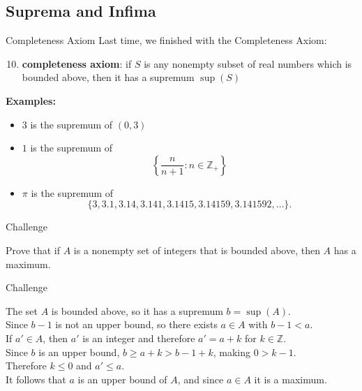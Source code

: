 \documentclass{beamer}
\begin{document}
\subsection{Suprema and Infima}
\begin{frame}{Completeness Axiom}
Last time, we finished with the Completeness Axiom:
\pause
\begin{enumerate}[\text{A}1]
\setcounter{enumi}{9}
\pause
\item \textbf{completeness axiom}: if $S$ is any nonempty subset of real numbers which is bounded above, then it has a supremum $\sup(S)$
\end{enumerate}
\pause
\textbf{Examples:}
\begin{itemize}
\pause
\item $3$ is the supremum of $(0,3)$
\pause
\item $1$ is the supremum of
$$\left\lbrace
\frac{n}{n+1}: n\in\mathbb{Z}_+
\right\rbrace$$
\pause
\item $\pi$ is the supremum of
$$\{3,3.1,3.14,3.141,3.1415,3.14159,3.141592,\dots\}.$$
\end{itemize}
\end{frame}

\begin{frame}{Challenge}
\begin{prob}
Prove that if $A$ is a nonempty set of integers that is bounded above, then $A$ has a maximum.
\end{prob}
\end{frame}

\begin{frame}{Challenge}
\begin{soln}
The set $A$ is bounded above, so it has a supremum $b=\sup(A)$. \\
\pause
Since $b-1$ is not an upper bound, so there exists $a\in A$ with $b-1 < a$. \\
\pause
If $a'\in A$, then $a'$ is an integer and therefore $a' = a+k$ for $k\in \mathbb{Z}$. \\
\pause
Since $b$ is an upper bound, $b\geq a+k>b-1+k$, making $0 > k-1$. \\
\pause
Therefore $k\leq 0$ and $a'\leq a$. \\
\pause
It follows that $a$ is an upper bound of $A$, and since $a\in A$ it is a maximum.
\end{soln}
\end{frame}
\end{document}

